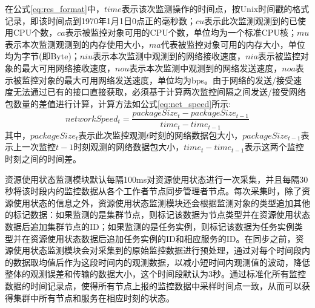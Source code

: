 在公式\ref{eq:res_format}中，$time$表示该次监测操作的时间点，按Unix时间戳的格式记录，即该时间点到1970年1月1日0点正的毫秒数；$cu$表示此次监测观测到的已使用CPU个数，$ca$表示被监控对象可用的CPU个数，单位均为一个标准CPU核；$mu$表示本次监测观测到的内存使用大小，$ma$代表被监控对象可用的内存大小，单位均为字节(即Byte)；$niu$表示本次监测中观测到的网络接收速度，$nia$表示被监控对象的最大可用网络接收速度，$nou$表示本次监测中观测到的网络发送速度，$noa$表示被监控对象的最大可用网络发送速度，单位均为bps。由于网络的发送/接受速度无法通过已有的接口直接获取，必须基于计算两次监控间隔之间发送/接受网络包数量的差值进行计算，计算方法如公式\ref{eq:net_speed}所示:
\begin{equation}\label{eq:net_speed}
networkSpeed_t = \frac{packageSize_t-packageSize_{t-1}}{time_t-time_{t-1}}
\end{equation}
其中，$packageSize_t$表示此次监控观测$t$时刻的网络数据包大小，$packageSize_{t-1}$表示上一次监控${t-1}$时刻观测的网络数据包大小，$time_t-time_{t-1}$表示这两个监控时刻之间的时间差。

资源使用状态监测模块默认每隔100ms对资源使用状态进行一次采集，并且每隔30秒将该时段内的监控数据从各个工作者节点同步管理者节点。每次采集时，除了资源使用状态的信息之外，资源使用状态监测模块还会根据监测对象的类型追加其他的标记数据：如果监测的是集群节点，则标记该数据为节点类型并在资源使用状态数据后追加集群节点的ID；如果监测的是任务实例，则标记该数据为任务实例类型并在资源使用状态数据后追加任务实例的ID和相应服务的ID。在同步之前，资源使用状态监测模块会对采集到的原始监控数据进行预处理，通过对每个时间段内的数据取均值后作为这段时间内的观测数据，以减小短时间内观测值的波动，降低整体的观测误差和传输的数据大小，这个时间段默认为3秒。通过标准化所有监控数据的时间记录点，使得所有节点上报的监控数据中采样时间点一致，从而可以获得集群中所有节点和服务在相应时刻的状态。

